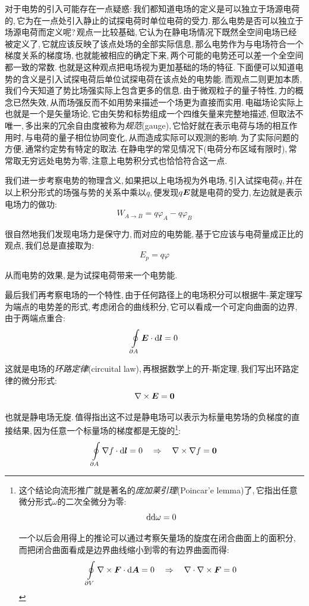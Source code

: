 对于电势的引入可能存在一点疑惑:\,我们都知道电场的定义是可以独立于场源电荷的,\,它为在一点处引入静止的试探电荷时单位电荷的受力.\,那么电势是否可以独立于场源电荷而定义呢?\,观点一比较基础,\,它认为在静电场情况下既然全空间电场已经被定义了,\,它就应该反映了该点处场的全部实际信息,\,那么电势作为与电场符合一个梯度关系的梯度场,\,也就能被相应的确定下来,\,两个可能的电势还可以差一个全空间都一致的常数.\,也就是这种观点把电场视为更加基础的场的特征.\,下面便可以知道电势的含义是引入试探电荷后单位试探电荷在该点处的电势能.\,而观点二则更加本质,\,我们今天知道了势比场强实际上包含更多的信息.\,由于微观粒子的量子特性,\,力的概念已然失效,\,从而场强反而不如用势来描述一个场更为直接而实用.\,电磁场论实际上也就是一个是矢量场论,\,它由矢势和标势组成一个四维矢量来完整地描述,\,但取法不唯一,\,多出来的冗余自由度被称为\emph{规范}(gauge),\,它恰好就在表示电荷与场的相互作用时,\,与电荷的量子相位协同变化,\,从而造成实际可以观测的影响.\,为了实际问题的方便,\,通常约定势有特定的取法.\,在静电学的常见情况下(电荷分布区域有限时),\,常常取无穷远处电势为零,\,注意上电势积分式也恰恰符合这一点.

我们进一步考察电势的物理含义,\,如果把以上电场视为外电场,\,引入试探电荷$q$,\,并在以上积分形式的场强与势的关系中乘以$q$,\,便发现$q\boldsymbol{E}$就是电荷的受力,\,左边就是表示电场力的做功:
\[W_{A\to B}=q\varphi_A-q\varphi_B\]

很自然地我们发现电场力是保守力,\,而对应的电势能,\,基于它应该与电荷量成正比的观点,\,我们总是直接取为:
\[E_p=q\varphi\]

从而电势的效果,\,是为试探电荷带来一个电势能.

最后我们再考察电场的一个特性,\,由于任何路径上的电场积分可以根据牛-莱定理写为端点的电势差的形式,\,考虑闭合的曲线积分,\,它可以看成一个可定向曲面的边界,\,由于两端点重合:
\[\oint\limits_{\partial A}\boldsymbol{E}\cdot\textrm{d} \boldsymbol{l}=0\]

这就是电场的\emph{环路定律}(circuital law),\,再根据数学上的开-斯定理,\,我们写出环路定律的微分形式:
\[\nabla\times\boldsymbol{E}=\boldsymbol{0}\]

也就是静电场无旋.\,值得指出这不过是静电场可以表示为标量电势场的负梯度的直接结果,\,因为任意一个标量场的梯度都是无旋的\footnote{这个结论向流形推广就是著名的\emph{庞加莱引理}(Poincar'e lemma)了,\,它指出任意微分形式$\omega$的二次全微分为零:
\[\textrm{d}\textrm{d}\omega=0\]

一个以后会用得上的推论可以通过考察矢量场的旋度在闭合曲面上的面积分,\,而把闭合曲面看成是边界曲线缩小到零的有边界曲面而得:
\[\oint\limits_{\partial V}\nabla \times \boldsymbol{F}\cdot\textrm{d} \boldsymbol{A}=0\quad \Rightarrow \quad \nabla\cdot\nabla \times\boldsymbol{F}=0\]}:
\[\oint\limits_{\partial A}\nabla f\cdot\textrm{d} \boldsymbol{l}=0\quad \Rightarrow \quad \nabla\times\nabla f=\boldsymbol{0}\]

